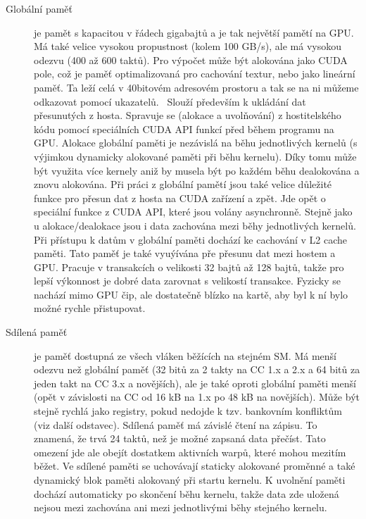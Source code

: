 \begin{description}
\item[Globální paměť] je pamět s kapacitou v řádech gigabajtů a je tak největší pamětí na GPU. Má také velice vysokou propustnost (kolem 100 GB/s), ale má vysokou odezvu (400 až 600 taktů). Pro výpočet může být alokována jako CUDA pole, což je paměť optimalizovaná pro cachování textur, nebo jako lineární paměť. Ta leží celá v 40bitovém adresovém prostoru a tak se na ni můžeme  odkazovat pomocí ukazatelů.~\cite{CUDAGuide} Slouží především k ukládání dat přesunutých z hosta. Spravuje se (alokace a uvolňování) z hostitelského kódu pomocí speciálních CUDA API funkcí před během programu na GPU. Alokace globální paměti je nezávislá na běhu jednotlivých kernelů (s výjimkou dynamicky alokované paměti při běhu kernelu). Díky tomu může být využita více kernely aniž by musela být po každém běhu dealokována a znovu alokována. Při práci z globální pamětí jsou také velice důležité funkce pro přesun dat z hosta na CUDA zařízení a zpět. Jde opět o speciální funkce z CUDA API, které jsou volány asynchronně. Stejně jako u alokace/dealokace jsou i data zachována mezi běhy jednotlivých kernelů. Při přístupu k datům v globální paměti dochází ke cachování v L2 cache paměti. Tato paměť je také vyuýívána pře přesunu dat mezi hostem a GPU. Pracuje v transakcích o velikosti 32 bajtů až 128 bajtů, takže pro lepší výkonnost je dobré data zarovnat s velikostí transakce. Fyzicky se nachází mimo GPU čip, ale dostatečně blízko na kartě, aby byl k ní bylo možné rychle přistupovat. 

\item[Sdílená paměť] je paměť dostupná ze všech vláken běžících na stejném SM. Má menší odezvu než globální paměť (32 bitů za 2 takty na CC 1.x a 2.x a 64 bitů za jeden takt na CC 3.x a novějších), ale je také oproti globální paměti menší (opět v závislosti na CC od 16 kB na 1.x po 48 kB na novějších). Může být stejně rychlá jako registry, pokud nedojde k tzv. bankovním konfliktům (viz další odstavec). Sdílená paměť má závislé čtení na zápisu. To znamená, že trvá 24 taktů, než je možné zapsaná data přečíst. Tato omezení jde ale obejít dostatkem aktivních warpů, které mohou mezitím běžet. Ve sdílené paměti se uchovávají staticky alokované proměnné a také dynamický blok paměti alokovaný při startu kernelu. K uvolnění paměti dochází automaticky po skončení běhu kernelu, takže data zde uložená nejsou mezi zachována ani mezi jednotlivými běhy stejného kernelu. \\


\end{description}
